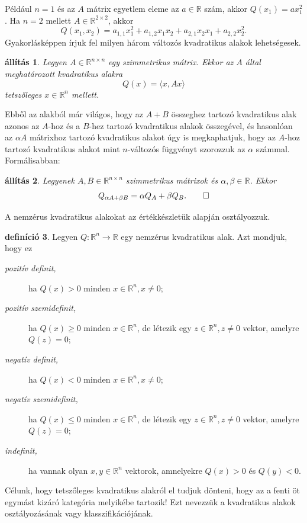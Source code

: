 \documentclass[a4paper, showtrims]{memoir}
\theoremstyle{plain}
\newtheorem{proposition}{állítás}[chapter]
\theoremstyle{remark}
\theoremstyle{definition}
\newtheorem{definition}[proposition]{definíció}
\newcommand{\ip}[2]{\langle#1,#2\rangle}
\begin{document}
Például $n=1$ és az $A$ mátrix egyetlem eleme az $a\in\mathbb{R}$ szám, akkor $Q(x_1)=ax_1^2$.
Ha $n=2$ mellett $A\in\mathbb{R}^{2\times 2}$, akkor
$$
Q\left( x_1,x_2 \right)=a_{1,1}x_1^2+a_{1,2}x_1x_2+a_{2,1}x_2x_1+a_{2,2}x_2^2.
$$
Gyakorlásképpen írjuk fel milyen három változós kvadratikus alakok lehetségesek.
\begin{proposition}
    Legyen $A\in\mathbb{R}^{n\times n}$ egy szimmetrikus mátrix.
    Ekkor az $A$ által meghatározott kvadratikus alakra
    \[
        Q(x)=\ip{x}{Ax}
    \]
    tetszőleges $x\in\mathbb{R}^n$ mellett.
\end{proposition}
Ebből az alakból már világos, hogy az $A+B$ összeghez tartozó kvadratikus alak azonos az $A$-hoz és a $B$-hez
tartozó kvadratikus alakok összegével, 
és hasonlóan az $\alpha A$ mátrixhoz tartozó kvadratikus alakot úgy is megkaphatjuk, hogy az $A$-hoz tartozó kvadratikus alakot mint $n$-változós függvényt szorozzuk az $\alpha$ számmal.
Formálisabban:
\begin{proposition}
    Legyenek $A,B\in\mathbb{R}^{n\times n}$ szimmetrikus mátrixok és $\alpha,\beta\in\mathbb{R}$.
    Ekkor
    \[
    Q_{\alpha A+\beta B}=\alpha Q_A+\beta Q_B.
    \qedhere
    \]
\end{proposition}
A nemzérus kvadratikus alakokat az értékkészletük alapján osztályozzuk.
\begin{definition}
    Legyen $Q:\mathbb{R}^n\to\mathbb{R}$ egy nemzérus kvadratikus alak.
    Azt mondjuk, hogy ez
    \begin{description}
        \item[{\normalfont \emph{pozitív definit,}}] ha $Q\left( x \right)>0$ minden $x\in\mathbb{R}^n,x\neq 0$;
        \item[{\normalfont\emph{pozitív szemidefinit,}}] ha $ Q\left( x \right)\geq 0$ minden $x\in\mathbb{R}^n$,
            de létezik egy $z\in\mathbb{R}^n, z\neq 0$ vektor, amelyre $Q\left( z \right)=0$;
        \item[{\normalfont\emph{negatív definit,}}] ha $ Q\left( x \right)<0$ minden $x\in\mathbb{R}^n,x\neq 0;$
        \item[{\normalfont\emph{negatív szemidefinit,}}] ha $ Q\left( x \right)\leq 0$ minden $x\in\mathbb{R}^n$,
            de létezik egy $z\in\mathbb{R}^n, z\neq 0$ vektor, amelyre $Q\left( z \right)=0$;
        \item[{\normalfont\emph{indefinit,}}] ha vannak olyan $x,y\in\mathbb{R}^n$ vektorok, amnelyekre
            $Q\left( x \right)>0$  és $Q\left( y \right)<0$.\qedhere
    \end{description}
\end{definition}
Célunk, hogy tetszőleges kvadratikus alakról el tudjuk dönteni, 
hogy az a fenti öt egymást kizáró kategória melyikébe tartozik!
Ezt nevezzük a kvadratikus alakok osztályozásának vagy klasszifikációjának.
\end{document}
